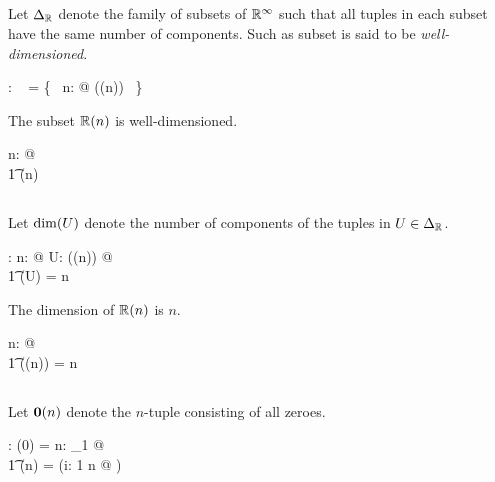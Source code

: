 \documentclass[11pt, oneside]{article}
\begin{document}
\subsection{}

Let $\Delta_{\mathbb{R}}$ denote the family of subsets of $\mathbb{R}^\infty$ such that all tuples in each subset have the same number of components.
Such as subset is said to be {\it well-dimensioned}.

\begin{axdef}
	\DeltaR: \family~\Rinf
\where
	\DeltaR = \bigcup \{~ n: \nat @ \power(\Rtuples(n)) ~\}
\end{axdef}

\begin{example}
The subset $\mathbb{R}(n)$ is well-dimensioned.

\begin{zed}
	\forall n: \nat @ \\
	\t1	\Rtuples(n) \in \DeltaR
\end{zed}

\end{example}

\subsection{}

Let $\operatorname{dim}(U)$ denote the number of components of the tuples in $U \in \Delta_{\mathbb{R}}$.

\begin{axdef}
	\dimR: \DeltaR \fun \nat
\where
	\forall n: \nat @ \forall U: \power(\Rtuples(n)) @ \\
	\t1	\dimR(U) = n
\end{axdef}

\begin{example}
The dimension of $\mathbb{R}(n)$ is $n$.

\begin{zed}
	\forall n: \nat @ \\
	\t1	\dimR(\Rtuples(n)) = n
\end{zed}

\end{example}

\subsection{}

Let $\mathbf{0}(n)$ denote the $n$-tuple consisting of all zeroes.

\begin{axdef}
	\zeroRn: \nat \fun \Rinf
\where
	\zeroRn(0) = \langle \rangle
\also
	\forall n: \nat_1 @ \\
	\t1	\zeroRn(n) = (\lambda i: 1 \upto n @ \zeroR)
\end{axdef}
\end{document}
